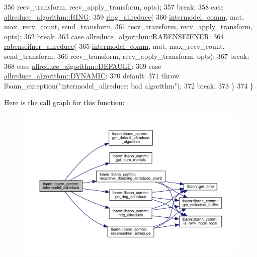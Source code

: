 \begin{DoxyCode}
356       recv\_transform, recv\_apply\_transform, opts);
357     \textcolor{keywordflow}{break};
358   \textcolor{keywordflow}{case} \hyperlink{classlbann_1_1lbann__comm_a02a03227cc27e3516f0d9f9812f32019ae69b8a2544417fb71e2767e95d7ac8f3}{allreduce\_algorithm::RING}:
359     \hyperlink{classlbann_1_1lbann__comm_a88162511dc2733dccd9c245e6c7ba53b}{ring\_allreduce}(
360       \hyperlink{classlbann_1_1lbann__comm_a2c51c5d8faf4f0ab4f43b892c55e597b}{intermodel\_comm}, mat, max\_recv\_count, send\_transform,
361       recv\_transform, recv\_apply\_transform, opts);
362     \textcolor{keywordflow}{break};
363   \textcolor{keywordflow}{case} \hyperlink{classlbann_1_1lbann__comm_a02a03227cc27e3516f0d9f9812f32019aecfb3869b05d9c2103f98c386a9e8a41}{allreduce\_algorithm::RABENSEIFNER}:
364     \hyperlink{classlbann_1_1lbann__comm_a925fcf1c15cb8ff10daed1dc1faed9ac}{rabenseifner\_allreduce}(
365       \hyperlink{classlbann_1_1lbann__comm_a2c51c5d8faf4f0ab4f43b892c55e597b}{intermodel\_comm}, mat, max\_recv\_count, send\_transform,
366       recv\_transform, recv\_apply\_transform, opts);
367     \textcolor{keywordflow}{break};
368   \textcolor{keywordflow}{case} \hyperlink{classlbann_1_1lbann__comm_a02a03227cc27e3516f0d9f9812f32019a5b39c8b553c821e7cddc6da64b5bd2ee}{allreduce\_algorithm::DEFAULT}:
369   \textcolor{keywordflow}{case} \hyperlink{classlbann_1_1lbann__comm_a02a03227cc27e3516f0d9f9812f32019a0fcc90da4811c877ba9f9c12f7d60bc9}{allreduce\_algorithm::DYNAMIC}:
370   \textcolor{keywordflow}{default}:
371     \textcolor{keywordflow}{throw} lbann\_exception(\textcolor{stringliteral}{"intermodel\_allreduce: bad algorithm"});
372     \textcolor{keywordflow}{break};
373   \}
374 \}
\end{DoxyCode}
Here is the call graph for this function\+:\nopagebreak
\begin{figure}[H]
\begin{center}
\leavevmode
\includegraphics[width=350pt]{classlbann_1_1lbann__comm_a34d5414f1ac4749e6f0937b638bb5cc6_cgraph}
\end{center}
\end{figure}
\mbox{\label{classlbann_1_1lbann__comm_a5834e95e066313d9328b22e4a0ec8663}} 
